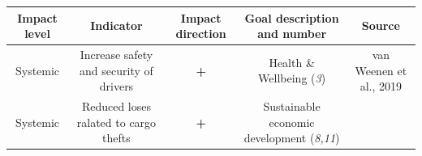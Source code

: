 \documentclass[
]{book}
\begin{document}
\begin{longtable}[]{@{}ccccc@{}}
\toprule
\begin{minipage}[b]{0.17\columnwidth}\centering
Impact level\strut
\end{minipage} & \begin{minipage}[b]{0.16\columnwidth}\centering
Indicator\strut
\end{minipage} & \begin{minipage}[b]{0.17\columnwidth}\centering
Impact direction\strut
\end{minipage} & \begin{minipage}[b]{0.17\columnwidth}\centering
Goal description and number\strut
\end{minipage} & \begin{minipage}[b]{0.17\columnwidth}\centering
Source\strut
\end{minipage}\tabularnewline
\midrule
\endhead
\begin{minipage}[t]{0.17\columnwidth}\centering
Systemic\strut
\end{minipage} & \begin{minipage}[t]{0.16\columnwidth}\centering
Increase safety and security of drivers\strut
\end{minipage} & \begin{minipage}[t]{0.17\columnwidth}\centering
\textbf{+}\strut
\end{minipage} & \begin{minipage}[t]{0.17\columnwidth}\centering
Health \& Wellbeing (\emph{3})\strut
\end{minipage} & \begin{minipage}[t]{0.17\columnwidth}\centering
van Weenen et al., 2019\strut
\end{minipage}\tabularnewline
\begin{minipage}[t]{0.17\columnwidth}\centering
Systemic\strut
\end{minipage} & \begin{minipage}[t]{0.16\columnwidth}\centering
Reduced loses ralated to cargo thefts\strut
\end{minipage} & \begin{minipage}[t]{0.17\columnwidth}\centering
\textbf{+}\strut
\end{minipage} & \begin{minipage}[t]{0.17\columnwidth}\centering
Sustainable economic development (\emph{8,11})\strut
\end{minipage} & \begin{minipage}[t]{0.17\columnwidth}\centering

\end{minipage}
\end{longtable}
\end{document}
